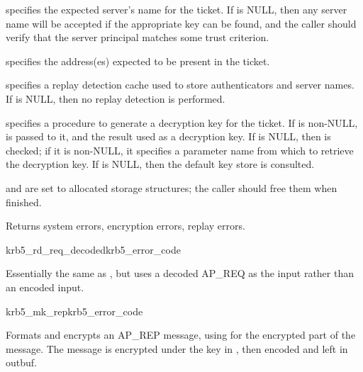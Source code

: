  specifies the expected server's name for the ticket.
If  is NULL, then any server name will be accepted if
the appropriate key can be found, and the caller should verify that the
server principal matches some trust criterion.

 specifies the address(es) expected to be present
in the ticket.

 specifies a replay detection cache used to store
authenticators and server names.  If  is NULL, then no
replay detection is performed.

 specifies a procedure to generate a decryption key for the
ticket.  If  is non-NULL,  is
passed to it, and the result used as a decryption key. If
 is NULL, then  is checked; if
it is non-NULL, it specifies a parameter name from which to retrieve the
decryption key.  If  is NULL, then the default key
store is consulted.

 and
 are set to allocated storage
structures; the caller should free them when finished.

Returns system errors, encryption errors, replay errors.

\begin{funcdecl}{krb5_rd_req_decoded}{krb5_error_code}{\funcin}
\funcendfuncarg
{}
\funcout
{}
\end{funcdecl}

Essentially the same as , but uses a decoded AP_REQ
as the input rather than an encoded input.

\begin{funcdecl}{krb5_mk_rep}{krb5_error_code}{\funcin}
\funcout
{}
\end{funcdecl}

Formats and encrypts an AP_REP message, using  for the
encrypted part of the message.  The message is encrypted under the key
in , then encoded and left in outbuf.

